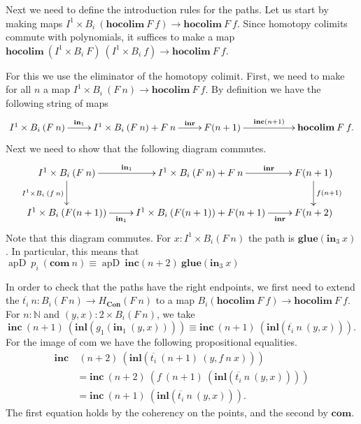 \documentclass[a4paper,UKenglish]{lipics-v2016}
\newcommand{\Boperator}[1]{\mathrm{\mathbf{#1}}}
\newcommand{\inn}{\Boperator{in}}
\newcommand{\apd}[0]{\operatorname{apD}}
\newcommand{\Con}[0]{\textbf{Con}}
\newcommand{\hocolim}[0]{\Boperator{hocolim}}
\newcommand{\inl}[0]{\Boperator{inl}}
\newcommand{\inr}[0]{\Boperator{inr}}
\newcommand{\glue}[0]{\Boperator{glue}}
\newcommand{\inc}[0]{\Boperator{inc}}
\newcommand{\com}[0]{\Boperator{com}}
\begin{document}
Next we need to define the introduction rules for the paths.
Let us start by making maps $I^1 \times B_i \> (\hocolim \> F \> f) \rightarrow \hocolim \> F \> f$.
Since homotopy colimits commute with polynomials, it suffices to make a map $\hocolim \> (I^1 \times B_i \> F) \> (I^1 \times B_i \> f)  \rightarrow \hocolim \> F \> f$.

For this we use the eliminator of the homotopy colimit.
First, we need to make for all $n$ a map $I^1 \times B_i \> (F \> n)  \rightarrow \hocolim \> F \> f$.
By definition we have the following string of maps
\[
\xymatrix
{
	I^1 \times B_i \> (F \> n) \ar[r]^-{\inn_1} & I^1 \times B_i \> (F \> n) + F \> n \ar[r]^-{\inr}& F(n+1) \ar[rr]^-{\inc(n+1)} & & \hocolim \> F \> f.
}
\]
Next we need to show that the following diagram commutes.
\[
\xymatrix
{
	I^1 \times B_i \> (F \> n) 
		\ar[r]^-{\inn_1} \ar[d]_{I^1 \times B_i \> (f \> n)} 
	& I^1 \times B_i \> (F \> n) + F \> n 
		\ar[r]^-{\inr} 
	& F(n+1) 
		\ar[d]^{f(n+1)}
	\\
	I^1 \times B_i \> (F(n+1)) 
		\ar[r]_-{\inn_1} 
	& I^1 \times B_i \> (F(n+1)) + F(n+1) 
		\ar[r]_-{\inr}
	& F(n+2) 
}
\]
Note that this diagram commutes.
For $x : I^1 \times B_i(F \> n)$ the path is $\glue(\inn_3 \> x)$.
In particular, this means that $\apd \> p_i \> (\com \> n) \equiv \apd \> \inc(n+2) \> \glue(\inn_3 \> x)$

In order to check that the paths have the right endpoints, we first need to extend the $\overline{t_i} \> n : B_i(F \> n) \rightarrow H_{\Con} (F \> n)$ to a map $B_i(\hocolim \> F \> f) \rightarrow \hocolim \> F \> f$.
For $n : \mathbb{N}$ and $(y, x) : 2 \times B_i(F \> n)$, we take 
\[
\inc \> (n+1) \> (\inl (g_1 (\inn_1 \> (y, x)))) \equiv \inc \> (n+1) \> (\inl(\overline{t_i} \> n \> (y, x))).
\]
For the image of com we have the following propositional equalities.
\begin{equation*}
\begin{split}
\inc &\> (n+2) \> (\inl(\overline{t_i} \> (n+1) \> (y, f \> n \> x)))
\\
&= \inc \> (n+2) \> ( f \> (n+1) \> (\inl(\overline{t_i} \> n \> (y, x))))
\\
&= \inc \> (n+1) \> (\inl(\overline{t_i} \> n \> (y, x))).
\end{split}
\end{equation*}
The first equation holds by the coherency on the points, and the second by $\com$.
\end{document}
